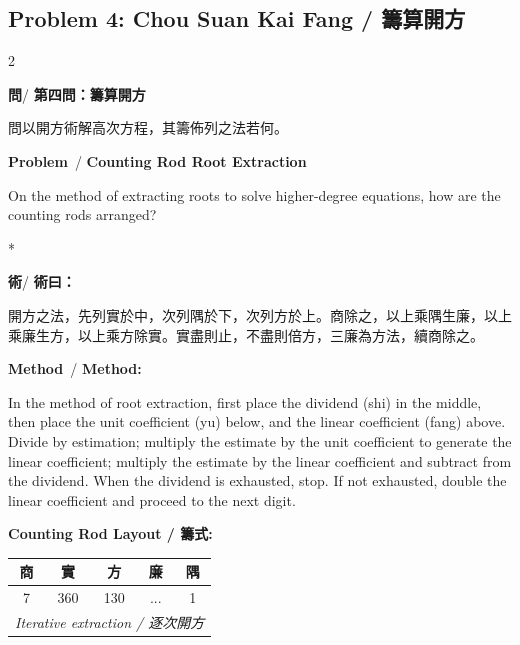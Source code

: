 \documentclass[11pt,a4paper]{article}
\newcommand{\wen}{\textbf{\color{sectioncolor}問}}
\newcommand{\shu}{\textbf{\color{methodcolor}術}}
\newcommand{\prb}{\textbf{\color{sectioncolor}Problem}}
\newcommand{\meth}{\textbf{\color{methodcolor}Method}}
\begin{document}
\subsection*{Problem 4: Chou Suan Kai Fang / 籌算開方}

\begin{paracol}{2}

\begin{leftcolumn*}
\wen / \textbf{第四問：籌算開方}

問以開方術解高次方程，其籌佈列之法若何。
\end{leftcolumn*}

\begin{rightcolumn}
\prb\ / \textbf{Counting Rod Root Extraction}

On the method of extracting roots to solve higher-degree 
equations, how are the counting rods arranged?
\end{rightcolumn}

\switchcolumn[0]*

\begin{leftcolumn*}
\shu / \textbf{術曰：}

開方之法，先列實於中，次列隅於下，次列方於上。商除之，以上乘隅生廉，以上乘廉生方，以上乘方除實。實盡則止，不盡則倍方，三廉為方法，續商除之。
\end{leftcolumn*}

\begin{rightcolumn}
\meth\ / \textbf{Method:}

In the method of root extraction, first place the dividend 
(shi) in the middle, then place the unit coefficient (yu) below, and the 
linear coefficient (fang) above. Divide by estimation; multiply the estimate 
by the unit coefficient to generate the linear coefficient; multiply the 
estimate by the linear coefficient and subtract from the dividend. When 
the dividend is exhausted, stop. If not exhausted, double the linear 
coefficient and proceed to the next digit.
\end{rightcolumn}

\end{paracol}

\vspace{0.5em}
\noindent\textbf{Counting Rod Layout / 籌式:}
\begin{center}
\begin{tabular}{|c|c|c|c|c|}
\hline
\textbf{商} & \textbf{實} & \textbf{方} & \textbf{廉} & \textbf{隅} \\
\hline
7 & 360 & 130 & ... & 1 \\
\hline
\multicolumn{5}{|c|}{\textit{Iterative extraction / 逐次開方}} \\
\hline
\end{tabular}
\end{center}
\end{document}
